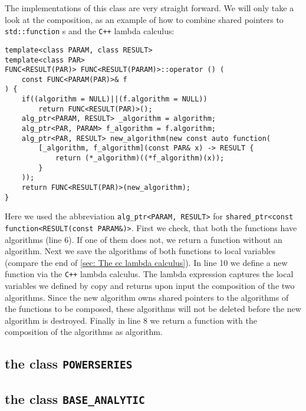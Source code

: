 \documentclass{article}
\newcommand{\cc}{\texttt{C++}\xspace}
\newcommand{\code}[1]{\texttt{#1}\xspace}
\begin{document}
The implementations of this class are very straight forward. We will only take a look at the composition, as an example of how to combine shared pointers to \code{std::function}s and the \cc lambda calculus:
\begin{lstlisting}
template<class PARAM, class RESULT>
template<class PAR>
FUNC<RESULT(PAR)> FUNC<RESULT(PARAM)>::operator () (
	const FUNC<PARAM(PAR)>& f
) {
	if((algorithm = NULL)||(f.algorithm = NULL))
		return FUNC<RESULT(PAR)>();
	alg_ptr<PARAM, RESULT> _algorithm = algorithm;
	alg_ptr<PAR, PARAM> f_algorithm = f.algorithm;
	alg_ptr<PAR, RESULT> new_algorithm(new const auto function(
		[_algorithm, f_algorithm](const PAR& x) -> RESULT {
			return (*_algorithm)((*f_algorithm)(x));
		}
	));
	return FUNC<RESULT(PAR)>(new_algorithm);
}
\end{lstlisting}
Here we used the abbreviation \code{alg\_ptr<PARAM, RESULT>} for \code{shared\_ptr<const function<RESULT(const PARAM\&)>}. First we check, that both the functions have algorithms (line 6). If one of them does not, we return a function without an algorithm. Next we save the algorithms of both functions to local variables (compare the end of \cref{sec: The cc lambda calculus}). In line 10 we define a new function via the \cc lambda calculus. The lambda expression captures the local variables we defined by copy and returns upon input the composition of the two algorithms. Since the new algorithm owns shared pointers to the algorithms of the functions to be composed, these algorithms will not be deleted before the new algorithm is destroyed. Finally in line 8 we return a function with the composition of the algorithms as algorithm.


\subsection{the class \texttt{POWERSERIES}}

\subsection{the class \texttt{BASE\_ANALYTIC}}
\end{document}
